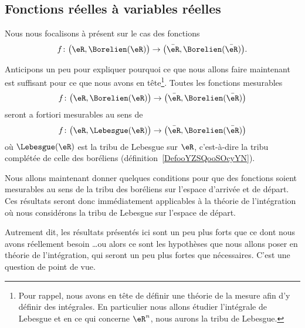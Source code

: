 \subsection{Fonctions réelles à variables réelles}

Nous nous focalisons à présent sur le cas des fonctions
\begin{equation}
    f\colon \big( \eR,\Borelien(\eR) \big)\to \big( \bar\eR,\Borelien(\bar \eR) \big).
\end{equation}

\begin{normaltext}      \label{NORMooNFOMooYnaflN}
    Anticipons un peu pour expliquer pourquoi ce que nous allons faire maintenant est suffisant pour ce que nous avons en tête\footnote{Pour rappel, nous avons en tête de définir une théorie de la mesure afin d'y définir des intégrales. En particulier nous allons étudier l'intégrale de Lebesgue et en ce qui concerne \( \eR^n\), nous aurons la tribu de Lebesgue.}. Toutes les fonctions mesurables
    \begin{equation}
        f\colon \big( \eR,\Borelien(\eR) \big)\to \big( \bar\eR,\Borelien(\bar \eR) \big)
    \end{equation}
    seront a fortiori mesurables au sens de
    \begin{equation}
        f\colon \big( \eR,\Lebesgue(\eR) \big)\to \big( \bar\eR,\Borelien(\bar \eR) \big)
    \end{equation}
    où \( \Lebesgue(\eR)\) est la tribu de Lebesgue sur \( \eR\), c'est-à-dire la tribu complétée de celle des boréliens (définition~\ref{DefooYZSQooSOcyYN}).
\end{normaltext}

\begin{normaltext}
    Nous allons maintenant donner quelques conditions pour que des fonctions soient mesurables au sens de la tribu des boréliens sur l'espace d'arrivée et de départ. Ces résultats seront donc immédiatement applicables à la théorie de l'intégration où nous considérons la tribu de Lebesgue sur l'espace de départ.

    Autrement dit, les résultats présentés ici sont un peu plus forts que ce dont nous avons réellement besoin \ldots ou alors ce sont les hypothèses que nous allons poser en théorie de l'intégration, qui seront un peu plus fortes que nécessaires. C'est une question de point de vue.
\end{normaltext}

